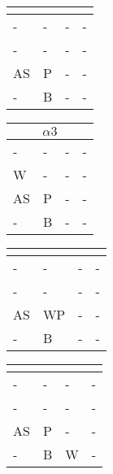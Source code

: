 \documentclass{math}
\begin{document}
\begin{center}
  \begin{tabular}{|p{0.6cm}|p{0.6cm}|p{0.6cm}|p{0.6cm}|}
    \hline
    \multicolumn{4}{|c|}{} \\ \hline
    - & - & - & - \\ \hline
    - & - & - & - \\ \hline
    AS & P & - & - \\ \hline
    - & B & - & - \\ \hline
  \end{tabular}
  \begin{tabular}{|p{0.6cm}|p{0.6cm}|p{0.6cm}|p{0.6cm}|}
    \hline
    \multicolumn{4}{|c|}{\( \alpha3 \)} \\ \hline
    - & - & - & - \\ \hline
    W & - & - & - \\ \hline
    AS & P & - & - \\ \hline
    - & B & - & - \\ \hline
  \end{tabular}
  \begin{tabular}{|p{0.6cm}|p{0.6cm}|p{0.6cm}|p{0.6cm}|}
    \hline
    \multicolumn{4}{|c|}{} \\ \hline
    - & - & - & - \\ \hline
    - & - & - & - \\ \hline
    AS & WP & - & - \\ \hline
    - & B & - & - \\ \hline
  \end{tabular}
  \begin{tabular}{|p{0.6cm}|p{0.6cm}|p{0.6cm}|p{0.6cm}|}
    \hline
    \multicolumn{4}{|c|}{} \\ \hline
    - & - & - & - \\ \hline
    - & - & - & - \\ \hline
    AS & P & - & - \\ \hline
    - & B & W & - \\ \hline
  \end{tabular} \\[0.5cm]


\end{center}
\end{document}
